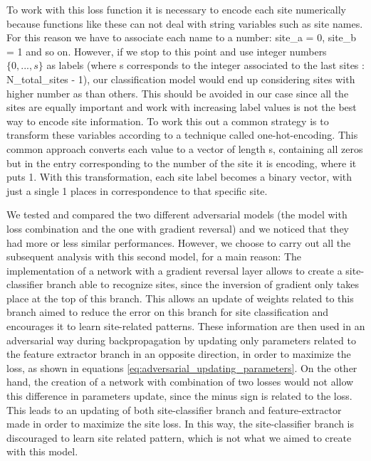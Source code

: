 \documentclass[11pt]{report}
\begin{document}
\begin{notes}
\item To work with this loss function it is necessary to encode each site numerically because functions like these can not deal with string variables such as site names.
For this reason we have to associate each name to a number: site\_a = 0, site\_b = 1 and so on.
However, if we stop to this point and use integer numbers $\{0, ..., s\}$ as labels (where s corresponds to the integer associated to the last sites : N\_total\_sites - 1), our classification model would end up considering sites with higher number as   than others.
This should be avoided in our case since all the sites are equally important and work with increasing label values is not the best way to encode site information. %
To work this out a common strategy is to transform these variables according to a technique called one-hot-encoding.
This common approach converts each value to a vector of length s, containing all zeros but in the entry corresponding to the number of the site it is encoding, where it puts 1.
With this transformation, each site label becomes a binary vector, with just a single 1 places in correspondence to that specific site.
\end{notes}


We tested and compared the two different adversarial models (the model with loss combination and the one with gradient reversal) and we noticed that they had more or less similar performances. However, we choose to carry out all the subsequent analysis with this second model, for a main reason:
The implementation of a network with a gradient reversal layer allows to create a site-classifier branch able to recognize sites, since the inversion of gradient only takes place at the top of this branch. This allows an update of weights related to this branch aimed to reduce the error on this branch for site classification and encourages it to learn site-related patterns. These information are then used in an adversarial way during backpropagation by updating only parameters related to the feature extractor branch in an opposite direction, in order to maximize the loss, as shown in equations \ref{eq:adversarial_updating_parameters}.
On the other hand, the creation of a network with combination of two losses would not allow this difference in parameters update, since the minus sign is related to the loss.
This leads to an updating of both site-classifier branch and feature-extractor made in order to maximize the site loss.
In this way, the site-classifier branch is discouraged to learn site related pattern, which is not what we aimed to create with this model.
\end{document}
